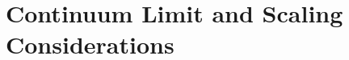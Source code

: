 \section{Continuum Limit and Scaling Considerations}
  \label{sec:continuum-limit-and-scaling-considerations}

  
  
  
